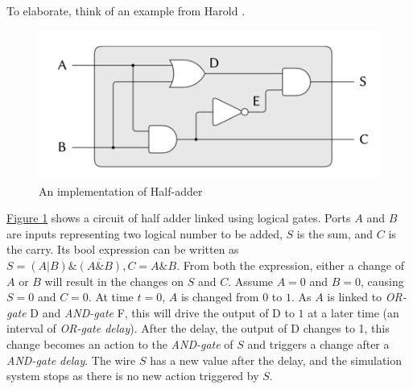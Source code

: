 \documentclass[12pt,a4paper]{report}
\begin{document}
        To elaborate, think of an example from Harold \cite{book:sicp}. 

        \begin{figure}[ht]
            \centerline{\includegraphics[scale=2.2]{halfadder}}
            \caption{An implementation of Half-adder}
            \label{figure_half_adder}
        \end{figure}

        \hyperref[figure_half_adder]{Figure \ref*{figure_half_adder}} shows a circuit of half adder linked using logical gates. Ports $A$ and $B$ are inputs representing two logical number to be added, $S$ is the sum, and $C$ is the carry. Its bool expression can be written as $S = (A|B)\&\overline{(A\&B)}, C = A\&B$. From both the expression, either a change of $A$ or $B$ will result in the changes on $S$ and $C$.
        Assume $A = 0$ and $B=0$, causing $S = 0$ and $C = 0$. At time $t=0$, $A$ is changed from $0$ to $1$. As $A$ is linked to \emph{OR-gate} D and \emph{AND-gate} F, this will drive the output of D to $1$ at a later time (an interval of \emph{OR-gate delay}). After the delay, the output of D changes to 1, this change becomes an action to the \emph{AND-gate} of $S$ and triggers a change after a \emph{AND-gate delay}.
        The wire $S$ has a new value after the delay, and the simulation system stops as there is no new action triggered by $S$.
\end{document}
